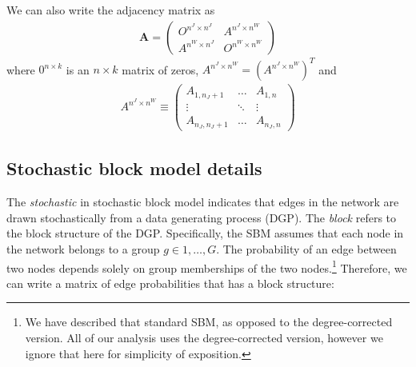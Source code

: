 \documentclass[12pt]{article}
\theoremstyle{definition}
\theoremstyle{plain}
\begin{document}
We can also write the adjacency matrix as 
\begin{align*}
\mathbf{A} = 
\begin{pmatrix}
O^{n^J\times n^J} 	& A^{n^J \times n^W} \\ 
A^{n^W \times n^J}  & O^{n^W\times n^W}
\end{pmatrix}
\end{align*}
where $0^{n\times k}$ is an $n \times k$ matrix of zeros, $ A^{n^J \times n^W} = (A^{n^J \times n^W})^T$ and 
\begin{align*}
A^{n^J \times n^W} \equiv 
\begin{pmatrix}
A_{1,n_J+1}   & \dots         & A_{1,n}       \\
\vdots        & \ddots        & \vdots        \\
A_{n_J,n_J+1} & \dots         & A_{n_J,n}
\end{pmatrix}
\end{align*}


\subsection{Stochastic block model details}

\label{sec:SBM_details}
The \emph{stochastic} in stochastic block model indicates that edges in the network are drawn stochastically from a data generating process (DGP). The \emph{block} refers to the block structure of the DGP. Specifically, the SBM assumes that each node in the network belongs to a group $g \in 1,\dots,G$. The probability of an edge between two nodes depends solely on group memberships of the two nodes.\footnote{We have described that standard SBM, as opposed to the degree-corrected version. All of our analysis uses the degree-corrected version, however we ignore that here for simplicity of exposition.} Therefore, we can write a matrix of edge probabilities that has a block structure: 
\end{document}
